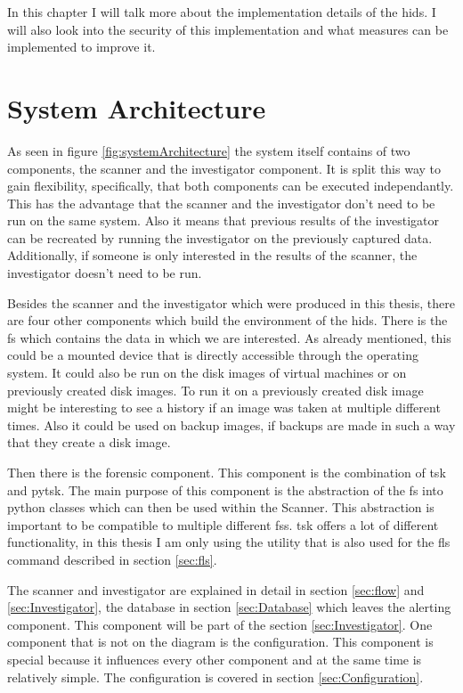 \documentclass[
	a4paper,					%
	10pt,							%
	twoside,					%
	openright,				%
	notitlepage,			%
	parskip=half,			%
]{scrreprt}					%
\begin{document}
In this chapter I will talk more about the implementation details of the \gls{hids}. I will also look into the security of this implementation and what measures can be implemented to improve it. 

\section{System Architecture}
\label{sec:Architecture}

As seen in figure \ref{fig:systemArchitecture} the system itself contains of two components, the scanner and the investigator component. It is split this way to gain flexibility, specifically, that both components can be executed independantly. This has the advantage that the scanner and the investigator don't need to be run on the same system. Also it means that previous results of the investigator can be recreated by running the investigator on the previously captured data. Additionally, if someone is only interested in the results of the scanner, the investigator doesn't need to be run.

Besides the scanner and the investigator which were produced in this thesis, there are four other components which build the environment of the \gls{hids}. There is the \gls{fs} which contains the data in which we are interested. As already mentioned, this could be a mounted device that is directly accessible through the operating system. It could also be run on the disk images of virtual machines or on previously created disk images. To run it on a previously created disk image might be interesting to see a history if an image was taken at multiple different times. Also it could be used on backup images, if backups are made in such a way that they create a disk image. 

Then there is the forensic component. This component is the combination of \gls{tsk} and \gls{pytsk}. The main purpose of this component is the abstraction of the \gls{fs} into python classes which can then be used within the Scanner. This abstraction is important to be compatible to multiple different \glspl{fs}. \gls{tsk} offers a lot of different functionality, in this thesis I am only using the utility that is also used for the fls command described in section \ref{sec:fls}. 

The scanner and investigator are explained in detail in section \ref{sec:flow} and \ref{sec:Investigator}, the database in section \ref{sec:Database} which leaves the alerting component. This component will be part of the section \ref{sec:Investigator}. One component that is not on the diagram is the configuration. This component is special because it influences every other component and at the same time is relatively simple. The configuration is covered in section \ref{sec:Configuration}.
\end{document}
